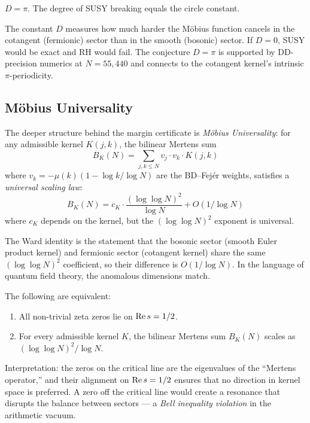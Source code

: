 \documentclass[11pt,a4paper]{article}
\begin{document}
\begin{conjecture}
\label{conj:ward}
$D = \pi$. The degree of SUSY breaking equals the circle constant.
\end{conjecture}

\noindent
The constant $D$ measures how much harder the M\"obius function
cancels in the cotangent (fermionic) sector than in the smooth
(bosonic) sector. If $D = 0$, SUSY would be exact and RH would
fail. The conjecture $D = \pi$ is supported by DD-precision
numerics at $N = 55{,}440$ and connects to the cotangent kernel's
intrinsic $\pi$-periodicity.

\subsection{M\"obius Universality}

The deeper structure behind the margin certificate is
\emph{M\"obius Universality}: for any admissible kernel
$K(j,k)$, the bilinear Mertens sum
\[
  B_K(N) = \sum_{j,k \leq N} v_j \cdot v_k \cdot K(j,k)
\]
where $v_k = -\mu(k)(1 - \log k/\log N)$ are the BD--Fej\'er weights,
satisfies a \emph{universal scaling law}:
\[
  B_K(N) = c_K \cdot \frac{(\log\log N)^2}{\log N} + O(1/\log N)
\]
where $c_K$ depends on the kernel, but the $(\log\log N)^2$ exponent
is universal.

The Ward identity is the statement that the bosonic sector
(smooth Euler product kernel) and fermionic sector (cotangent
kernel) share the same $(\log\log N)^2$ coefficient,
so their difference is $O(1/\log N)$. In the language of
quantum field theory, the anomalous dimensions match.

\begin{conjecture}
\label{conj:universality}
The following are equivalent:
\begin{enumerate}
  \item[(a)] All non-trivial zeta zeros lie on $\operatorname{Re} s = 1/2$.
  \item[(b)] For every admissible kernel $K$, the bilinear Mertens
    sum $B_K(N)$ scales as $(\log\log N)^2/\log N$.
\end{enumerate}
\end{conjecture}

\noindent
Interpretation: the zeros on the critical line are the eigenvalues
of the ``Mertens operator,'' and their alignment on $\operatorname{Re} s = 1/2$
ensures that no direction in kernel space is preferred.
A zero off the critical line would create a resonance that disrupts
the balance between sectors --- a \emph{Bell inequality violation}
in the arithmetic vacuum.
\end{document}
